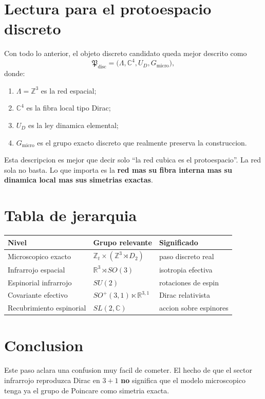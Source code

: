 \section{Lectura para el protoespacio discreto}
Con todo lo anterior, el objeto discreto candidato queda mejor descrito como
\begin{equation}
\mathfrak{P}_{\mathrm{disc}}=
\bigl(\Lambda,\mathbb{C}^4,U_D,G_{\mathrm{micro}}\bigr),
\label{c25:eq:proto}
\end{equation}
donde:
\begin{enumerate}[label=\arabic*.]
    \item \(\Lambda=\mathbb{Z}^3\) es la red espacial;
    \item \(\mathbb{C}^4\) es la fibra local tipo Dirac;
    \item \(U_D\) es la ley dinamica elemental;
    \item \(G_{\mathrm{micro}}\) es el grupo exacto discreto que realmente preserva la construccion.
\end{enumerate}

Esta descripcion es mejor que decir solo \enquote{la red cubica es el protoespacio}. La red sola no basta. Lo que importa es la \textbf{red mas su fibra interna mas su dinamica local mas sus simetrias exactas}.

\section{Tabla de jerarquia}
\begin{center}
\begin{tabular}{@{}lll@{}}
\toprule
Nivel & Grupo relevante & Significado \\
\midrule
Microscopico exacto & \(\mathbb{Z}_t\times(\mathbb{Z}^3\rtimes D_2)\) & paso discreto real \\
Infrarrojo espacial & \(\mathbb{R}^3\rtimes SO(3)\) & isotropia efectiva \\
Espinorial infrarrojo & \(SU(2)\) & rotaciones de espin \\
Covariante efectivo & \(SO^+(3,1)\ltimes\mathbb{R}^{3,1}\) & Dirac relativista \\
Recubrimiento espinorial & \(SL(2,\mathbb{C})\) & accion sobre espinores \\
\bottomrule
\end{tabular}
\end{center}

\section{Conclusion}
Este paso aclara una confusion muy facil de cometer. El hecho de que el sector infrarrojo reproduzca Dirac en \(3+1\) \textbf{no} significa que el modelo microscopico tenga ya el grupo de Poincare como simetria exacta.

